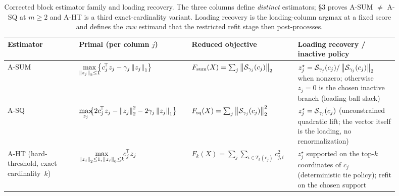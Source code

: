 \begin{table}[t]
\centering
\caption{Corrected block estimator family and loading recovery. The three columns define \emph{distinct} estimators; §3 proves A-SUM $\neq$ A-SQ at $m\!\ge\!2$ and A-HT is a third exact-cardinality variant. Loading recovery is the loading-column argmax at a fixed score and defines the \emph{raw} estimand that the restricted refit stage then post-processes.}
\label{tab:a-models-and-loadings}
\small
\begin{tabular}{p{0.17\linewidth}p{0.26\linewidth}p{0.23\linewidth}p{0.24\linewidth}}
\toprule
Estimator & Primal (per column $j$) & Reduced objective & Loading recovery / inactive policy \\
\midrule
A-SUM &
$\displaystyle \max_{\left\lVert z_j \right\rVert_2\le 1}\!\!\bigl\{c_j^{\!\top}z_j-\gamma_j\left\lVert z_j \right\rVert_1\bigr\}$ &
$F_{\mathrm{sum}}(X)=\sum_j\left\lVert \mathcal{S}_{\gamma_j}(c_j) \right\rVert_2$ &
$z_j^\star = \mathcal{S}_{\gamma_j}(c_j)/\left\lVert \mathcal{S}_{\gamma_j}(c_j) \right\rVert_2$ when nonzero; otherwise $z_j=0$ is the chosen inactive branch (loading-ball slack) \\
\addlinespace
A-SQ &
$\displaystyle \max_{z_j}\!\!\bigl\{2c_j^{\!\top}z_j-\left\lVert z_j \right\rVert_2^2-2\gamma_j\left\lVert z_j \right\rVert_1\bigr\}$ &
$F_{\mathrm{sq}}(X)=\sum_j\left\lVert \mathcal{S}_{\gamma_j}(c_j) \right\rVert_2^2$ &
$z_j^\star = \mathcal{S}_{\gamma_j}(c_j)$ (unconstrained quadratic lift; the vector itself is the loading, no renormalization) \\
\addlinespace
A-HT (hard-threshold, exact cardinality~$k$) &
$\displaystyle \max_{\left\lVert z_j \right\rVert_2\le1,\,\left\lVert z_j \right\rVert_0\le k}\!\!c_j^{\!\top}z_j$ &
$F_k(X)=\sum_j\sum_{i\in T_k(c_j)}c_{j,i}^2$ &
$z_j^\star$ supported on the top-$k$ coordinates of $c_j$ (deterministic tie policy); refit on the chosen support \\
\bottomrule
\end{tabular}
\end{table}
